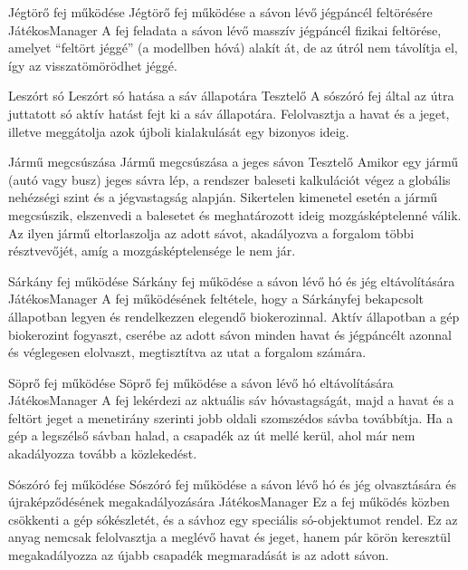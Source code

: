 \begin{use-case}
    {Jégtörő fej működése}
    {Jégtörő fej működése a sávon lévő jégpáncél feltörésére}
    {JátékosManager}
    A fej feladata a sávon lévő masszív jégpáncél fizikai feltörése, amelyet “feltört jéggé” (a modellben hóvá) alakít át, de az útról nem távolítja el, így az visszatömörödhet jéggé. 
\end{use-case}

\begin{use-case}
    {Leszórt só}
    {Leszórt só hatása a sáv állapotára}
    {Tesztelő}
    A sószóró fej által az útra juttatott só aktív hatást fejt ki a sáv állapotára. Felolvasztja a havat és a jeget, illetve meggátolja azok újboli kialakulását egy bizonyos ideig. 
\end{use-case}

\begin{use-case}
    {Jármű megcsúszása}
    {Jármű megcsúszása a jeges sávon}
    {Tesztelő}
    Amikor egy jármű (autó vagy busz) jeges sávra lép, a rendszer baleseti kalkulációt végez a globális nehézségi szint és a jégvastagság alapján. Sikertelen kimenetel esetén a jármű megcsúszik, elszenvedi a balesetet és meghatározott ideig mozgásképtelenné válik. Az ilyen jármű eltorlaszolja az adott sávot, akadályozva a forgalom többi résztvevőjét, amíg a mozgásképtelensége le nem jár.
\end{use-case}

\begin{use-case}
    {Sárkány fej működése}
    {Sárkány fej működése a sávon lévő hó és jég eltávolítására}
    {JátékosManager}
    A fej működésének feltétele, hogy a Sárkányfej bekapcsolt állapotban legyen és rendelkezzen elegendő biokerozinnal. Aktív állapotban a gép biokerozint fogyaszt, cserébe az adott sávon minden havat és jégpáncélt azonnal és véglegesen elolvaszt, megtisztítva az utat a forgalom számára.
\end{use-case}

\begin{use-case}
    {Söprő fej működése}
    {Söprő fej működése a sávon lévő hó eltávolítására}
    {JátékosManager}
    A fej lekérdezi az aktuális sáv hóvastagságát, majd a havat és a feltört jeget a menetirány szerinti jobb oldali szomszédos sávba továbbítja. Ha a gép a legszélső sávban halad, a csapadék az út mellé kerül, ahol már nem akadályozza tovább a közlekedést.
\end{use-case}

\begin{use-case}
    {Sószóró fej működése}
    {Sószóró fej működése a sávon lévő hó és jég olvasztására és újraképződésének megakadályozására}
    {JátékosManager}
    Ez a fej működés közben csökkenti a gép sókészletét, és a sávhoz egy speciális só-objektumot rendel. Ez az anyag nemcsak felolvasztja a meglévő havat és jeget, hanem pár körön keresztül megakadályozza az újabb csapadék megmaradását is az adott sávon. 
\end{use-case}

